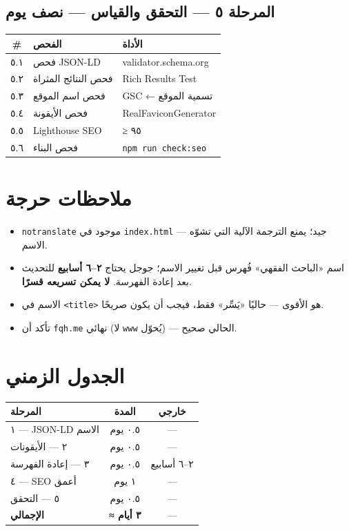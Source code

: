 \documentclass[11pt]{article}
\newcommand{\code}[1]{\textcolor{darkbg}{\texttt{\small #1}}}
\begin{document}
\subsection{المرحلة ٥ — التحقق والقياس — نصف يوم}
\begin{tabular}{@{}c p{6cm} p{6cm}@{}}
\toprule
\textbf{\#} & \textbf{الفحص} & \textbf{الأداة} \\
\midrule
٥.١ & فحص JSON-LD & validator.schema.org \\
٥.٢ & فحص النتائج المثراة & Rich Results Test \\
٥.٣ & فحص اسم الموقع & GSC ← تسمية الموقع \\
٥.٤ & فحص الأيقونة & RealFaviconGenerator \\
٥.٥ & Lighthouse SEO & ≥ ٩٥ \\
٥.٦ & فحص البناء & \code{npm run check:seo} \\
\bottomrule
\end{tabular}

\section{ملاحظات حرجة}
\begin{riskbox}
\begin{itemize}
\item \code{notranslate} موجود في \code{index.html} — جيد؛ يمنع الترجمة الآلية التي تشوّه الاسم.
\item اسم «الباحث الفقهي» فُهرس قبل تغيير الاسم؛ جوجل يحتاج \textbf{٢–٦ أسابيع} للتحديث بعد إعادة الفهرسة. \textbf{لا يمكن تسريعه قسرًا}.
\item الاسم في \code{<title>} هو الأقوى — حاليًا «يَسِّر» فقط، فيجب أن يكون صريحًا.
\item تأكد أن \code{fqh.me} نهائي (لا \code{www} يُحوّل) — الحالي صحيح.
\end{itemize}
\end{riskbox}

\section{الجدول الزمني}
\begin{center}
\renewcommand{\arraystretch}{1.3}
\begin{tabular}{@{}p{7cm} c c@{}}
\toprule
\textbf{المرحلة} & \textbf{المدة} & \textbf{خارجي} \\
\midrule
١ — JSON-LD الاسم & ٠.٥ يوم & — \\
٢ — الأيقونات & ٠.٥ يوم & — \\
٣ — إعادة الفهرسة & ٠.٥ يوم & \textcolor{warnred}{٢–٦ أسابيع} \\
٤ — SEO أعمق & ١ يوم & — \\
٥ — التحقق & ٠.٥ يوم & — \\
\midrule
\textbf{الإجمالي} & \textbf{≈ ٣ أيام} & — \\
\bottomrule
\end{tabular}
\end{center}
\end{document}
